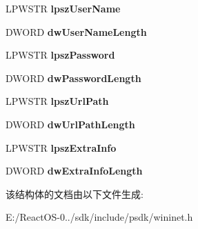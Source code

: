 \begin{DoxyCompactItemize}
L\+P\+W\+S\+TR {\bfseries lpsz\+User\+Name}
\item 
\mbox{\label{struct_u_r_l___c_o_m_p_o_n_e_n_t_s_w_a804478d897e1dcaa871fc84bbed9c414}} 
D\+W\+O\+RD {\bfseries dw\+User\+Name\+Length}
\item 
\mbox{\label{struct_u_r_l___c_o_m_p_o_n_e_n_t_s_w_a5ecafacad1c37c163eac6d439ef4c50e}} 
L\+P\+W\+S\+TR {\bfseries lpsz\+Password}
\item 
\mbox{\label{struct_u_r_l___c_o_m_p_o_n_e_n_t_s_w_aeb83518c8bac0b34ea70e8b9f57906c1}} 
D\+W\+O\+RD {\bfseries dw\+Password\+Length}
\item 
\mbox{\label{struct_u_r_l___c_o_m_p_o_n_e_n_t_s_w_adc380083603b71703d337f0deadf2224}} 
L\+P\+W\+S\+TR {\bfseries lpsz\+Url\+Path}
\item 
\mbox{\label{struct_u_r_l___c_o_m_p_o_n_e_n_t_s_w_a48f9fc3ee11f77da5c6c66058d32951e}} 
D\+W\+O\+RD {\bfseries dw\+Url\+Path\+Length}
\item 
\mbox{\label{struct_u_r_l___c_o_m_p_o_n_e_n_t_s_w_ae3f5828872abdf61d413bf4f7e7cc31c}} 
L\+P\+W\+S\+TR {\bfseries lpsz\+Extra\+Info}
\item 
\mbox{\label{struct_u_r_l___c_o_m_p_o_n_e_n_t_s_w_a4a40b1d022c8723b7e8818344f59c7bf}} 
D\+W\+O\+RD {\bfseries dw\+Extra\+Info\+Length}
\end{DoxyCompactItemize}


该结构体的文档由以下文件生成\+:\begin{DoxyCompactItemize}
\item 
E\+:/\+React\+O\+S-\/0../sdk/include/psdk/wininet.\+h\end{DoxyCompactItemize}
